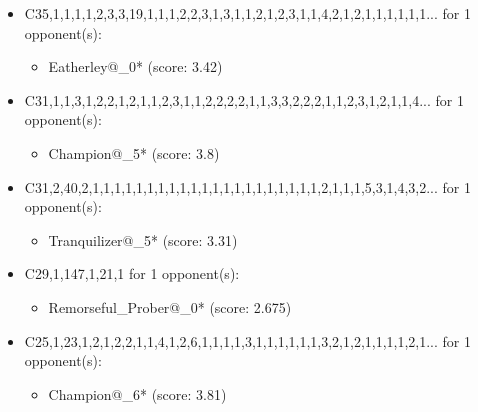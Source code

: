 \begin{appendices}
\begin{itemize}
    \item C35,1,1,1,1,2,3,3,19,1,1,1,2,2,3,1,3,1,1,2,1,2,3,1,1,4,2,1,2,1,1,1,1,1,1... for 1 opponent(s):
    \begin{multicols}{3}
         \begin{itemize}
            \item Eatherley@\_0* (score: 3.42)
        \end{itemize}
     \end{multicols}
     
    \item C31,1,1,3,1,2,2,1,2,1,1,2,3,1,1,2,2,2,2,1,1,3,3,2,2,2,1,1,2,3,1,2,1,1,4... for 1 opponent(s):
    \begin{multicols}{3}
         \begin{itemize}
            \item Champion@\_5* (score: 3.8)
        \end{itemize}
     \end{multicols}
     
    \item C31,2,40,2,1,1,1,1,1,1,1,1,1,1,1,1,1,1,1,1,1,1,1,1,1,2,1,1,1,5,3,1,4,3,2... for 1 opponent(s):
    \begin{multicols}{3}
         \begin{itemize}
            \item Tranquilizer@\_5* (score: 3.31)
        \end{itemize}
     \end{multicols}
     
    \item C29,1,147,1,21,1 for 1 opponent(s):
    \begin{multicols}{3}
         \begin{itemize}
            \item Remorseful\_Prober@\_0* (score: 2.675)
        \end{itemize}
     \end{multicols}
     
    \item C25,1,23,1,2,1,2,2,1,1,4,1,2,6,1,1,1,1,3,1,1,1,1,1,1,3,2,1,2,1,1,1,1,2,1... for 1 opponent(s):
    \begin{multicols}{3}
         \begin{itemize}
            \item Champion@\_6* (score: 3.81)
        \end{itemize}
     \end{multicols}
     

\end{itemize}
\end{appendices}
